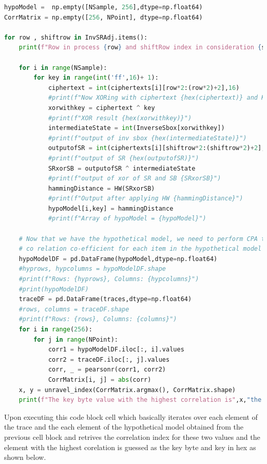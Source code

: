 \documentclass[12pt, letterpaper, oneside]{report}
\begin{document}
\newpage 
\begin{lstlisting}[language=Python, caption=Code Block for divide and conquer ]
hypoModel =  np.empty([NSample, 256],dtype=np.float64)
CorrMatrix = np.empty([256, NPoint], dtype=np.float64)

for row , shiftrow in InvSRAdj.items():
    print(f"Row in process {row} and shiftRow index in consideration {shiftrow}")

    for i in range(NSample):
        for key in range(int('ff',16)+ 1):
            ciphertext = int(ciphertexts[i][row*2:(row*2)+2],16)
            #print(f"Now XORing with ciphertext {hex(ciphertext)} and Key {key}")
            xorwithkey = ciphertext ^ key
            #print(f"XOR result {hex(xorwithkey)}")
            intermediateState = int(InverseSbox[xorwithkey])
            #print(f"output of inv sbox {hex(intermediateState)}")
            outputofSR = int(ciphertexts[i][shiftrow*2:(shiftrow*2)+2],16)
            #print(f"output of SR {hex(outputofSR)}")
            SRxorSB = outputofSR ^ intermediateState
            #print(f"output of xor of SR and SB {SRxorSB}")
            hammingDistance = HW(SRxorSB)
            #print(f"Output after applying HW {hammingDistance}")
            hypoModel[i,key] = hammingDistance
            #print(f"Array of hypoModel = {hypoModel}")

    # Now that we have the hypothetical model, we need to perform CPA that means we have to find
    # co relation co-efficient for each item in the hypothetical model and actual power trace.
    hypoModelDF = pd.DataFrame(hypoModel,dtype=np.float64)
    #hyprows, hypcolumns = hypoModelDF.shape
    #print(f"Rows: {hyprows}, Columns: {hypcolumns}")
    #print(hypoModelDF)
    traceDF = pd.DataFrame(traces,dtype=np.float64)
    #rows, columns = traceDF.shape
    #print(f"Rows: {rows}, Columns: {columns}")
    for i in range(256):
        for j in range(NPoint):
            corr1 = hypoModelDF.iloc[:, i].values
            corr2 = traceDF.iloc[:, j].values
            corr, _ = pearsonr(corr1, corr2)
            CorrMatrix[i, j] = abs(corr)       
    x, y = unravel_index(CorrMatrix.argmax(), CorrMatrix.shape)
    print(f"The key byte value with the highest correlation is",x,"the key byte value in hex is ",hex(x))
\end{lstlisting}
\newpage 
Upon executing this code block cell which basically iterates over each element of the trace and the each element of the hypothetical model obtained from the previous cell block and retrives the correlation index for these two values and the element with the highest corelation is guessed as the key byte and key in hex as shown below.
\end{document}
